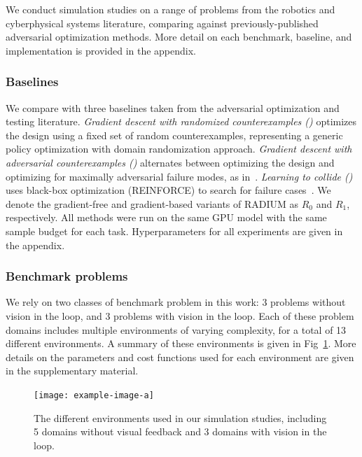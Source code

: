 {We conduct simulation studies on a range of problems from the robotics and cyberphysical systems literature, comparing against previously-published adversarial optimization methods. More detail on each benchmark, baseline, and implementation is provided in the appendix.

\subsubsection{Baselines}

We compare with three baselines taken from the adversarial optimization and testing literature.
%
\textit{Gradient descent with randomized counterexamples (\gdr)} optimizes the design using a fixed set of random counterexamples, representing a generic policy optimization with domain randomization approach.
%
\textit{Gradient descent with adversarial counterexamples (\gda)} alternates between optimizing the design and optimizing for maximally adversarial failure modes, as in~\cite{hanselmannKINGGeneratingSafetyCritical2022a,dawsonRobustCounterexampleguidedOptimization2022b}.
%
\textit{Learning to collide (\ltc)} uses black-box optimization (REINFORCE) to search for failure cases~\cite{dingLearningCollideAdaptive2020a}.
%
We denote the gradient-free and gradient-based variants of RADIUM as $R_0$ and $R_1$, respectively.
%
All methods were run on the same GPU model with the same sample budget for each task. Hyperparameters for all experiments are given in the appendix.

\subsubsection{Benchmark problems}

We rely on two classes of benchmark problem in this work: 3 problems without vision in the loop, and 3 problems with vision in the loop. Each of these problem domains includes multiple environments of varying complexity, for a total of 13 different environments. A summary of these environments is given in Fig~\ref{fig:environments}. More details on the parameters and cost functions used for each environment are given in the supplementary material.

\begin{figure}[t]
    \centering
    \texttt{[image: example-image-a]}  %
    \caption{The different environments used in our simulation studies, including 5 domains without visual feedback and 3 domains with vision in the loop.}\label{fig:environments}
\end{figure}

}
